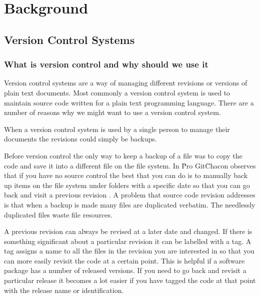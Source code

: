 \chapter{Background}

\section{Version Control Systems}
\subsection{What is version control and why should we use it}
Version control systems are a way of managing different revisions or versions of plain text documents. Most commonly a version control system is used to maintain source code written for a plain text programming language.  There are a number of reasons why we might want to use a version control system.

When a version control system is used by a single person to manage their documents the revisions could simply be backups.

Before version control the only way to keep a backup of a file was to copy the code and save it into a different file on the file system.
In \"Pro Git\" Chacon observes that if you have no source control the best that you can do is to manually back up items on the file system under folders with a specific date so that you can go back and visit a previous revision \cite{Chacon}.  A problem that source code revision addresses is that when a backup is made many files are duplicated verbatim.  The needlessly duplicated files waste file resources.

 A previous revision can always be revised at a later date and changed. If there is something significant about a particular revision it can be labelled with a tag. A tag assigns a name to all the files in the revision you are interested in so that you can more easily revisit the code at a certain point.  This is helpful if a software package has a number of released versions.  If you need to go back and revisit a particular release it becomes a lot easier if you have tagged the code at that point with the release name or identification.

